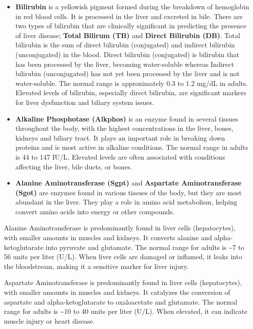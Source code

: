 \documentclass[11pt]{article}
\begin{document}
\begin{itemize}
\item
  \textbf{Bilirubin} is a yellowish pigment formed during the breakdown
  of hemoglobin in red blood cells. It is processed in the liver and
  excreted in bile. There are two types of bilirubin that are clinically
  significant in predicting the presence of liver disease; \textbf{Total
  Bilirum (TB)} and \textbf{Direct Bilirubin (DB)}. Total bilirubin is
  the sum of direct bilirubin (conjugated) and indirect bilirubin
  (unconjugated) in the blood. Direct bilirubin (conjugated) is
  bilirubin that has been processed by the liver, becoming water-soluble
  whereas Indirect bilirubin (unconjugated) has not yet been processed
  by the liver and is not water-soluble. The normal range is
  approximately 0.3 to 1.2 mg/dL in adults. Elevated levels of
  bilirubin, especially direct bilirubin, are significant markers for
  liver dysfunction and biliary system issues.
\item
  \textbf{Alkaline Phosphotase (Alkphos)} is an enzyme found in several
  tissues throughout the body, with the highest concentrations in the
  liver, bones, kidneys and biliary tract. It plays an important role in
  breaking down proteins and is most active in alkaline conditions. The
  normal range in adults is 44 to 147 IU/L. Elevated levels are often
  associated with conditions affecting the liver, bile ducts, or bones.
\item
  \textbf{Alanine Aminotransferase (Sgpt)} and \textbf{Aspartate
  Aminotransferase (Sgot)} are enzymes found in various tissues of the
  body, but they are most abundant in the liver. They play a role in
  amino acid metabolism, helping convert amino acids into energy or
  other compounds.
\end{itemize}

Alanine Aminotransferase is predominantly found in liver cells
(hepatocytes), with smaller amounts in muscles and kidneys. It converts
alanine and alpha-ketoglutarate into pyruvate and glutamate. The normal
range for adults is \textasciitilde7 to 56 units per liter (U/L). When
liver cells are damaged or inflamed, it leaks into the bloodstream,
making it a sensitive marker for liver injury.

Aspartate Aminotransferase is predominantly found in liver cells
(hepatocytes), with smaller amounts in muscles and kidneys. It catalyzes
the conversion of aspartate and alpha-ketoglutarate to oxaloacetate and
glutamate. The normal range for adults is \textasciitilde10 to 40 units
per liter (U/L). When elevated, it can indicate muscle injury or heart
disease.
\end{document}
